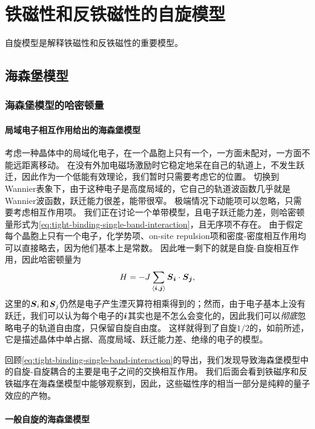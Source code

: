 \chapter{铁磁性和反铁磁性的自旋模型}\label{chap:magnetic}


自旋模型是解释铁磁性和反铁磁性的重要模型。

\section{海森堡模型}

\subsection{海森堡模型的哈密顿量}

\subsubsection{局域电子相互作用给出的海森堡模型}

考虑一种晶体中的局域化电子，在一个晶胞上只有一个，一方面未配对，一方面不能远距离移动。
在没有外加电磁场激励时它稳定地呆在自己的轨道上，不发生跃迁，因此作为一个低能有效理论，我们暂时只需要考虑它的位置。
切换到Wannier表象下，由于这种电子是高度局域的，它自己的轨道波函数几乎就是Wannier波函数，跃迁能力很差，能带很窄。
极端情况下动能项可以忽略，只需要考虑相互作用项。
我们正在讨论一个单带模型，且电子跃迁能力差，则哈密顿量形式为\eqref{eq:tight-binding-single-band-interaction}，且无序项不存在。
由于假定每个晶胞上只有一个电子，化学势项、on-site repulsion项和密度-密度相互作用均可以直接略去，因为他们基本上是常数。
因此唯一剩下的就是自旋-自旋相互作用，因此哈密顿量为
\begin{equation}
    H = - J \sum_{\langle \vb*{i}, \vb*{j} \rangle} \vb*{S}_{\vb*{i}} \cdot \vb*{S}_{\vb*{j}},
    \label{eq:heisenberg-nearest}
\end{equation}
这里的$\vb*{S}_i$和$\vb*{S}_j$仍然是电子产生湮灭算符相乘得到的；然而，由于电子基本上没有跃迁，我们可以认为每个电子的$\vb*{i}$其实也是不怎么会变化的，因此我们可以\emph{彻底}忽略电子的轨道自由度，只保留自旋自由度。
这样就得到了自旋$1/2$的，如前所述，它是描述晶体中单占据、高度局域、跃迁能力差、绝缘的电子的模型。

回顾\eqref{eq:tight-binding-single-band-interaction}的导出，我们发现导致海森堡模型中的自旋-自旋耦合的主要是电子之间的交换相互作用。
我们后面会看到铁磁序和反铁磁序在海森堡模型中能够观察到，因此，这些磁性序的相当一部分是纯粹的量子效应的产物。

\subsubsection{一般自旋的海森堡模型}

